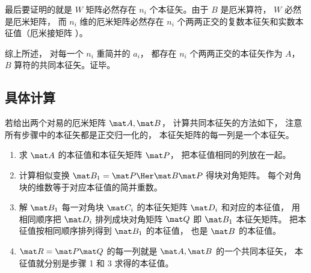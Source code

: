 最后要证明的就是 $W$ 矩阵必然存在 $n_i$ 个本征矢。由于 $B$ 是厄米算符，  $W$ 必然是厄米矩阵， 而 $n_i$ 维的厄米矩阵必然存在 $n_i$ 个两两正交的复数本征矢和实数本征值（厄米接矩阵%
）。

综上所述， 对每一个 $n_i$ 重简并的 $a_i$，  都存在 $n_i$ 个两两正交的本征矢作为 $A$，  $B$ 算符的共同本征矢。证毕。

\subsection{具体计算}

若给出两个对易的厄米矩阵 $\mat A, \mat B$， 计算共同本征矢的方法如下， 注意所有步骤中的本征矢都是正交归一化的， 本征矢矩阵的每一列是一个本征矢。
\begin{enumerate}
\item 求 $\mat A$ 的本征值和本征矢矩阵 $\mat P$， 把本征值相同的列放在一起。
\item 计算相似变换 $\mat B_1 = \mat P\Her \mat B\mat P$ 得块对角矩阵。 每个对角块的维数等于对应本征值的简并重数。
\item 解 $\mat B_1$ 每一对角块 $\mat C_i$ 的本征矢矩阵 $\mat D_i$ 和对应的本征值， 用相同顺序把 $\mat D_i$ 排列成块对角矩阵 $\mat Q$ 即 $\mat B_1$ 本征矢矩阵。 把本征值按相同顺序排列得到 $\mat B_1$ 的本征值， 也是 $\mat B$ 的本征值。
\item $\mat R = \mat P\mat Q$ 的每一列就是 $\mat A, \mat B$ 的一个共同本征矢， 本征值就分别是步骤 1 和 3 求得的本征值。
\end{enumerate}

